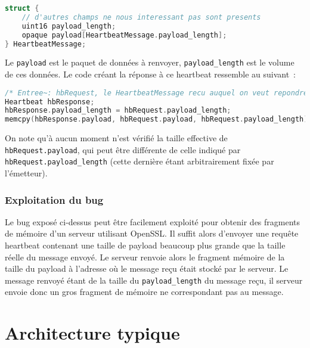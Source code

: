 \documentclass[a4paper,oneside,1pt]{article}
\begin{document}

\begin{lstlisting}[language=C]
struct {
	// d'autres champs ne nous interessant pas sont presents
	uint16 payload_length;
	opaque payload[HeartbeatMessage.payload_length];
} HeartbeatMessage;
\end{lstlisting}

Le \texttt{payload} est le paquet de données à renvoyer, \texttt{payload\_length} est le volume de ces données. Le code créant la réponse à ce heartbeat ressemble au suivant~:

\begin{lstlisting}[language=C]
/* Entree~: hbRequest, le HeartbeatMessage recu auquel on veut repondre */
Heartbeat hbResponse;
hbResponse.payload_length = hbRequest.payload_length;
memcpy(hbResponse.payload, hbRequest.payload, hbRequest.payload_length);
\end{lstlisting}

On note qu'à aucun moment n'est vérifié la taille effective de \texttt{hbRequest.payload}, qui peut être différente de celle indiqué par \texttt{hbRequest.payload\_length} (cette dernière étant arbitrairement fixée par l'émetteur).

\subsubsection{Exploitation du bug}
Le bug exposé ci-dessus peut être facilement exploité pour obtenir des fragments de mémoire d'un serveur utilisant OpenSSL. Il suffit alors d'envoyer une requête heartbeat contenant une taille de payload beaucoup plus grande que la taille réelle du message envoyé. Le serveur renvoie alors le fragment mémoire de la taille du payload à l'adresse où le message reçu était stocké par le serveur. Le message renvoyé étant de la taille du \texttt{payload\_length} du message reçu, il serveur envoie donc un gros fragment de mémoire ne correspondant pas au message.


\section{Architecture typique}
\end{document}
